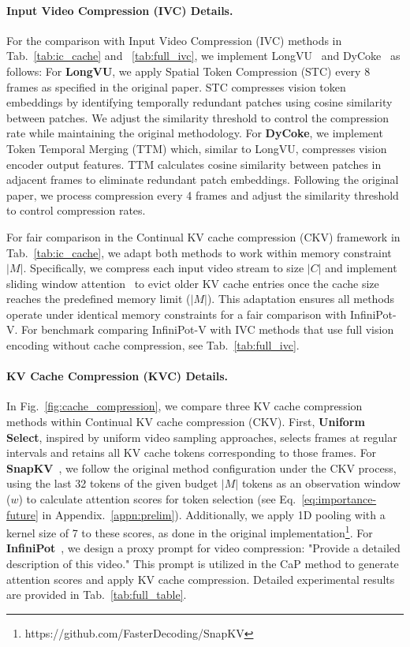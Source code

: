 \paragraph{Input Video Compression (IVC) Details.}
For the comparison with Input Video Compression (IVC) methods in Tab.~\ref{tab:ic_cache} and ~\ref{tab:full_ivc}, we implement LongVU~\cite{shen2024longvu} and DyCoke~\cite{tao2024dycokedynamiccompressiontokens} as follows: For \textbf{LongVU}, we apply Spatial Token Compression (STC) every 8 frames as specified in the original paper. STC compresses vision token embeddings by identifying temporally redundant patches using cosine similarity between patches. We adjust the similarity threshold to control the compression rate while maintaining the original methodology. For \textbf{DyCoke}, we implement Token Temporal Merging (TTM) which, similar to LongVU, compresses vision encoder output features. TTM calculates cosine similarity between patches in adjacent frames to eliminate redundant patch embeddings. Following the original paper, we process compression every 4 frames and adjust the similarity threshold to control compression rates.

For fair comparison in the Continual KV cache compression (CKV) framework in Tab.~\ref{tab:ic_cache}, we adapt both methods to work within memory constraint $|M|$. Specifically, we compress each input video stream to size $|C|$ and implement sliding window attention~\cite{Beltagy2020Longformer} to evict older KV cache entries once the cache size reaches the predefined memory limit ($|M|$). This adaptation ensures all methods operate under identical memory constraints for a fair comparison with InfiniPot-V. For benchmark comparing InfiniPot-V with IVC methods that use full vision encoding without cache compression, see Tab.~\ref{tab:full_ivc}.

\paragraph{KV Cache Compression (KVC) Details.} In Fig.~\ref{fig:cache_compression}, we compare three KV cache compression methods within Continual KV cache compression (CKV). First, \textbf{Uniform Select}, inspired by uniform video sampling approaches, selects frames at regular intervals and retains all KV cache tokens corresponding to those frames. For \textbf{SnapKV}~\cite{li2024snapkv}, we follow the original method configuration under the CKV process, using the last 32 tokens of the given budget $|M|$ tokens as an observation window ($w$) to calculate attention scores for token selection (see Eq.~\ref{eq:importance-future} in Appendix.~\ref{appn:prelim}). Additionally, we apply 1D pooling with a kernel size of 7 to these scores, as done in the original implementation\footnote{https://github.com/FasterDecoding/SnapKV}. For \textbf{InfiniPot}~\cite{kim-etal-2024-infinipot}, we design a proxy prompt for video compression: "Provide a detailed description of this video." This prompt is utilized in the CaP method to generate attention scores and apply KV cache compression. Detailed experimental results are provided in Tab.~\ref{tab:full_table}.

